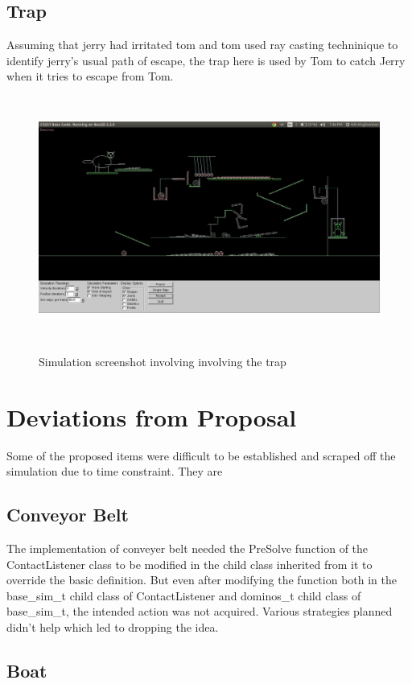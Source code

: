 \documentclass{article}
\begin{document}
    \subsection{Trap}
        Assuming that jerry had irritated tom and tom used ray casting  \cite{ray} techninique to identify jerry's usual path of escape, the trap here is used by Tom to catch Jerry when it tries to escape from Tom.  
    \begin{figure}[h] 
    \caption{Simulation screenshot involving involving the trap}
    \begin{center}
    \includegraphics[height=8cm,scale=0.30]{Ending}
    \label{Flying Ball}
    \end{center}
    \end{figure}

\section{Deviations from Proposal}
    Some of the proposed items were difficult to be established and scraped off the simulation due to time constraint. They are
    \subsection{Conveyor Belt}
        The  implementation of conveyer belt needed the PreSolve function of the ContactListener class to be modified in the child class inherited from it to override the basic definition. But even after modifying the function both in the base\_sim\_t child class of ContactListener and dominos\_t child class of base\_sim\_t, the intended action was not acquired. Various strategies planned didn't help which led to dropping the idea.
    \subsection{Boat}
\end{document}
